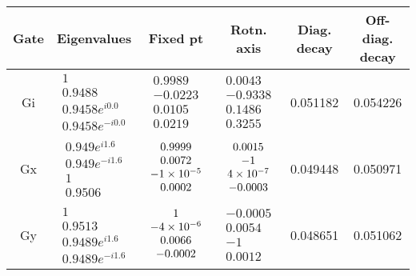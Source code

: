 {\begin{table}[h]
\begin{center}
\begin{tabular}[l]{|c|c|c|c|c|c|}
\hline
Gate & Eigenvalues & Fixed pt & Rotn. axis & Diag. decay & Off-diag. decay \\ \hline
Gi & $ \begin{array}{c}
1 \\ 
0.9488 \\ 
0.9458e^{i0.0} \\ 
0.9458e^{-i0.0}
 \end{array} $
 & $ \begin{array}{c}
0.9989 \\ 
-0.0223 \\ 
0.0105 \\ 
0.0219
 \end{array} $
 & $ \begin{array}{c}
0.0043 \\ 
-0.9338 \\ 
0.1486 \\ 
0.3255
 \end{array} $
 & 0.051182 & 0.054226 \\ \hline
Gx & $ \begin{array}{c}
0.949e^{i1.6} \\ 
0.949e^{-i1.6} \\ 
1 \\ 
0.9506
 \end{array} $
 & $ \begin{array}{c}
0.9999 \\ 
0.0072 \\ 
-1\times 10^{-5} \\ 
0.0002
 \end{array} $
 & $ \begin{array}{c}
0.0015 \\ 
-1 \\ 
4\times 10^{-7} \\ 
-0.0003
 \end{array} $
 & 0.049448 & 0.050971 \\ \hline
Gy & $ \begin{array}{c}
1 \\ 
0.9513 \\ 
0.9489e^{i1.6} \\ 
0.9489e^{-i1.6}
 \end{array} $
 & $ \begin{array}{c}
1 \\ 
-4\times 10^{-6} \\ 
0.0066 \\ 
-0.0002
 \end{array} $
 & $ \begin{array}{c}
-0.0005 \\ 
0.0054 \\ 
-1 \\ 
0.0012
 \end{array} $
 & 0.048651 & 0.051062 \\ \hline
\end{tabular}


\end{center}
\end{table}}
